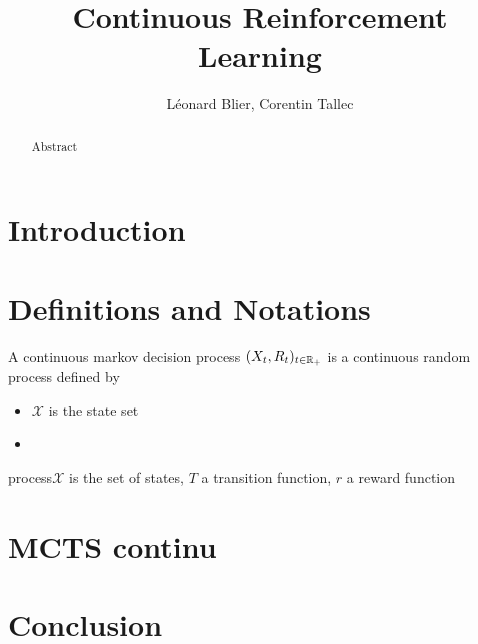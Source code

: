 \documentclass{article}
\title{Continuous Reinforcement Learning}
\author{L\'eonard Blier, Corentin Tallec}
\begin{document}
\maketitle


\begin{abstract}
Abstract
\end{abstract}

\section{Introduction}
\label{sec:introduction}


\section{Definitions and Notations}
\label{sec:definitions}

\begin{definition}
  A continuous markov decision process $(X_{t}, R_{t})_{t\in\mathbb{R}_{+}}$ is a continuous random process defined by 
  \begin{itemize}
  \item $\mathcal{X}$ is the state set 
  \item 
  \end{itemize}
  process$\mathcal{X}$ is the set of states, $T$ a transition function, $r$ a reward function
\end{definition}




\section{MCTS continu}
\label{sec:mcts-continu}


\section{Conclusion}
\label{sec:conclusion}
\end{document}
